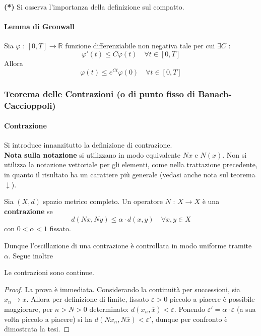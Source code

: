 \documentclass[10pt]{article}
\theoremstyle{plain}
\begin{document}
\textbf{(*)} Si osserva l'importanza della definizione sul compatto.

\paragraph{Lemma di Gronwall}
\begin{lem}
Sia $\varphi$ : $[0,T] \rightarrow \mathbb{R}$ funzione differenziabile non negativa tale per cui $\exists C$ : 
\[\varphi'(t) \leq C \varphi(t) \quad \forall t \in [0,T]\]
Allora 
\[\varphi(t) \leq e^{Ct}\varphi(0) \quad \forall t \in [0,T]\]
\end{lem}

\subsubsection{Teorema delle Contrazioni (o di punto fisso di Banach-Caccioppoli)}
\paragraph{Contrazione}  Si introduce innanzitutto la definizione di contrazione.
\\\textbf{Nota sulla notazione} si utilizzano in modo equivalente $N x$ e $N(x)$. Non si utilizza la notazione vettoriale per gli elementi, come nella trattazione precedente, in quanto il risultato ha un carattere più generale (vedasi anche nota sul teorema $\downarrow$).
\begin{defin}
Sia $(X,d)$ spazio metrico completo. Un operatore $N$ : $X \rightarrow X$ è una \textbf{contrazione} se 
\[d(N x, N y) \leq \alpha \cdot d(x,y) \quad \forall x,y \in X\]
con $0 < \alpha < 1$ fissato.
\end{defin}
Dunque l'oscillazione di una contrazione è controllata in modo uniforme tramite $\alpha$. Segue inoltre
\begin{prop}
Le contrazioni sono continue.
\end{prop}
\begin{proof}
La prova è immediata. Considerando la continuità per successioni, sia $x_n \rightarrow \overline{x}$. Allora per definizione di limite, fissato $\varepsilon > 0$ piccolo a piacere è possibile maggiorare, per $n > N > 0$ determinato: $d(x_n, \overline{x}) < \varepsilon$. Ponendo $\varepsilon' = \alpha \cdot \varepsilon$ (a sua volta piccolo a piacere) si ha $d( N x_n, N \overline{x}) < \varepsilon'$, dunque per confronto è dimostrata la tesi. 
\end{proof}
\end{document}
